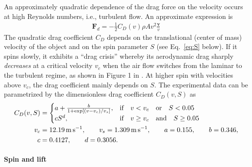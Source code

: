 \documentclass[letterpaper]{scrartcl}
\renewcommand{\vec}[1]{\ensuremath{\mathbf{#1}}}
\begin{document}
An approximately quadratic dependence of the drag force on the
velocity occurs at high Reynolds numbers, i.e., turbulent flow. An
approximate expression is
\begin{gather}
\label{eq:Fdrag}
  \vec{F}_d = -\frac{1}{2} C_{D}(v) \rho A v^{2} \frac{\vec{v}}{v}
\end{gather}
The quadratic drag coefficient $C_{D}$ depends on the translational
(center of mass) velocity of the object and on the spin parameter $S$
(see Eq.~\ref{eq:S} below). If it spins slowly, it exhibits a ``drag
crisis'' whereby its aerodynamic drag sharply \emph{decreases} at a
critical velocity $v_{c}$ when the air flow switches from the laminar
to the turbulent regime, as shown in Figure 1 in
\citet{Goff:2010aa}. At higher spin with velocities above $v_{c}$, the
drag coefficient mainly depends on $S$. The experimental data can be
parametrized by the dimensionless drag coefficient $C_{D}(v, S)$ as
\citep{Goff:2010aa}
\begin{align}
  \label{eq:CDv}
  C_{D}(v, S) &=
             \begin{cases}
               a + \frac{b}{1 + \exp[(v - v_{c})/v_{s}]}, &
               \text{if}\quad v < v_{c} \quad \text{or}\quad S < 0.05\\
               c S^{d}, & \text{if} \quad v \ge v_{c} \quad \text{and}\quad S \ge 0.05                
             \end{cases}\\
  v_{c} &= \SI{12.19}{m.s^{-1}}, \qquad v_{s} = \SI{1.309}{m.s^{-1}}, \qquad
  a = 0.155, \qquad b = 0.346, \notag\\
  c &= 0.4127, \qquad d = 0.3056. \notag
\end{align}



\paragraph{Spin and lift}
\end{document}
